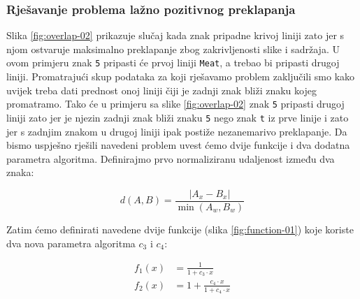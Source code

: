 \documentclass[times, utf8, zavrsni]{fer}
\begin{document}
\subsubsection{Rješavanje problema lažno pozitivnog preklapanja}
Slika \ref{fig:overlap-02} prikazuje slučaj kada znak pripadne krivoj liniji
zato jer s njom ostvaruje maksimalno preklapanje zbog zakrivljenosti slike i
sadržaja. U ovom primjeru znak \lstinline{5} pripasti će prvoj liniji
\lstinline{Meat}, a trebao bi pripasti drugoj liniji. Promatrajući skup
podataka za koji rješavamo problem zaključili smo kako uvijek treba dati
prednost onoj liniji čiji je zadnji znak bliži znaku kojeg promatramo. Tako će
u primjeru sa slike \ref{fig:overlap-02} znak \lstinline{5} pripasti drugoj
liniji zato jer je njezin zadnji znak bliži znaku \lstinline{5} nego znak
\lstinline{t} iz prve linije i zato jer s zadnjim znakom u drugoj liniji ipak
postiže nezanemarivo preklapanje. Da bismo uspješno rješili navedeni problem
uvest ćemo dvije funkcije i dva dodatna parametra algoritma. Definirajmo prvo
normaliziranu udaljenost između dva znaka:

\begin{equation}
d(A, B) = \frac{|A_x - B_x|}{\min(A_w, B_w)}
\end{equation}

Zatim ćemo definirati navedene dvije funkcije (slika \ref{fig:function-01})
koje koriste dva nova parametra algoritma $c_3$ i $c_4$:

\begin{align}
f_1(x) &= \frac{1}{1 + c_3 \cdot x} \\[10pt]
f_2(x) &= 1 + \frac{c_4 \cdot x}{1 + c_4 \cdot x}
\end{align}
\end{document}
